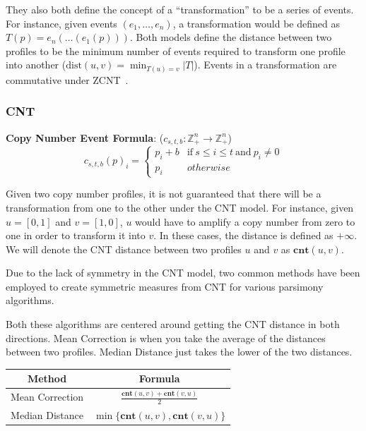 They also both define the concept of a ``transformation'' to be a series of events. For instance, given events $(e_1, \hdots, e_n)$, a transformation would be defined as $T(p) = e_n(\hdots(e_1(p)))$. Both models define the distance between two profiles to be the minimum number of events required to transform one profile into another ($\text{dist}(u, v) = \min_{T(u) = v} |T|$). Events in a transformation are commutative under ZCNT~\cite{zcnt_paper}.

\subsubsection{CNT}

\newcommand{\cnt}{\textbf{cnt}}
\newcommand{\zcnt}{\textbf{zcnt}}

{\bf Copy Number Event Formula}: ($c_{s, t, b}: \mathbb{Z}_+^n \rightarrow \mathbb{Z}_+^n$) 
\begin{equation}
    c_{s, t, b}{(p)}_i = \begin{cases}
        p_i + b & \text{if}~s \leq i \leq t~\text{and}~p_i \neq 0 \\ 
        p_i & otherwise
    \end{cases}
\end{equation}

Given two copy number profiles, it is not guaranteed that there will be a transformation from one to the other under the CNT model. For instance, given $u=[0,1]$ and $v=[1,0]$, $u$ would have to amplify a copy number from zero to one in order to transform it into $v$. In these cases, the distance is defined as $+\infty$. We will denote the CNT distance between two profiles $u$ and $v$ as $\cnt(u, v)$.

Due to the lack of symmetry in the CNT model, two common methods have been employed to create symmetric measures from CNT for various parsimony algorithms.\vspace{5pt}

Both these algorithms are centered around getting the CNT distance in both directions. Mean Correction is when you take the average of the distances between two profiles. Median Distance just takes the lower of the two distances.

\def\arraystretch{2}

\vspace{10pt}

\begin{tabular}{|c|c|}
    \hline
    {\bf Method} & {\bf Formula} \\  \hline \hline
    Mean Correction & $\frac{\cnt (u, v) + \cnt (v, u)}{2}$ \\ \hline
    Median Distance & $\min \{\cnt (u, v), \cnt (v, u)\}$ \\ \hline
\end{tabular}

